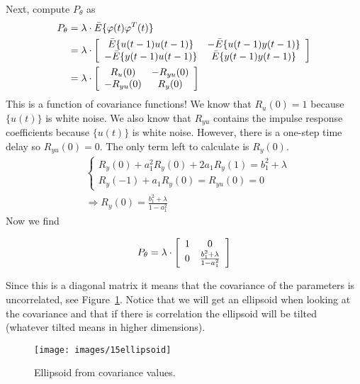\begin{example}
Next, compute $P_\theta$ as
\begin{align*}
P_\theta &= \lambda\cdot \bar{E}\{\varphi(t)\varphi^T(t)\} \\
&= \lambda\cdot \left[\begin{array}{c c}
\bar{E}\{u(t-1)u(t-1)\} & -\bar{E}\{u(t-1)y(t-1)\} \\
-\bar{E}\{y(t-1)u(t-1)\} & \bar{E}\{y(t-1)y(t-1)\}
\end{array}\right] \\
&= \lambda\cdot \left[\begin{array}{c c}
R_u(0) & -R_{yu}(0) \\ -R_{yu}(0) & R_y(0)
\end{array}\right]
\end{align*}
This is a function of covariance functions! We know that $R_u(0)=1$ because $\{u(t)\}$ is white noise.
We also know that $R_{yu}$ contains the impulse response coefficients because $\{u(t)\}$ is white noise.
However, there is a one-step time delay so $R_{yu}(0) = 0$.
The only term left to calculate is $R_y(0)$.
\begin{align*}
&\begin{cases} R_y(0) + a_1^2R_y(0)+2a_1R_y(1) = b_1^2+\lambda \\ R_y(-1)+a_1R_y(0) = R_{yu}(0) = 0 \end{cases} \\
&\Rightarrow R_y(0) = \frac{b_1^2+\lambda}{1-a_1^2}
\end{align*}
Now we find

\begin{equation*}
P_\theta = \lambda\cdot \left[\begin{array}{c c} 1 & 0 \\ 0 & \frac{b_1^2+\lambda}{1-a_1^2} \end{array}\right]
\end{equation*}

Since this is a diagonal matrix it means that the covariance of the parameters is uncorrelated, see Figure~\ref{fig:15ellipsoid}.
Notice that we will get an ellipsoid when looking at the covariance and that if there is correlation the ellipsoid will be tilted (whatever tilted means in higher dimensions).

\begin{figure}[ht!]
\centering
\texttt{[image: images/15ellipsoid]}
\caption{Ellipsoid from covariance values.}%
\label{fig:15ellipsoid}
\end{figure}


\end{example}
